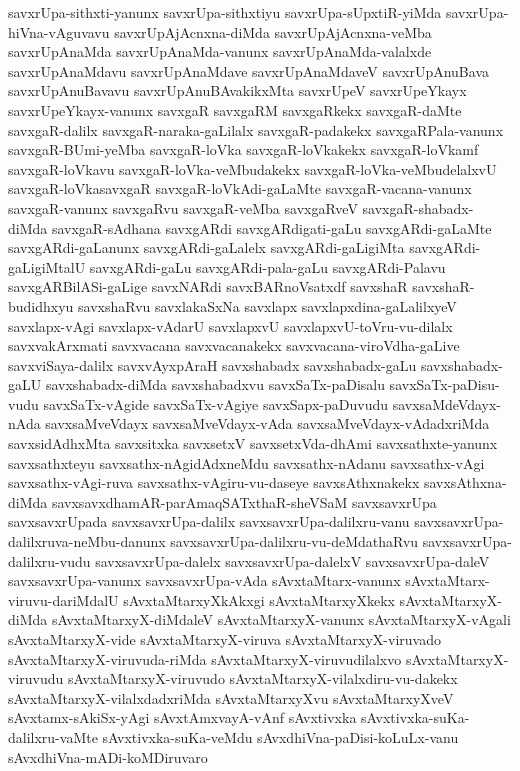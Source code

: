 {savxrUpa-sithxti-yanunx
savxrUpa-sithxtiyu
savxrUpa-sUpxtiR-yiMda
savxrUpa-hiVna-vAguvavu
savxrUpAjAcnxna-diMda
savxrUpAjAcnxna-veMba
savxrUpAnaMda
savxrUpAnaMda-vanunx
savxrUpAnaMda-valalxde
savxrUpAnaMdavu
savxrUpAnaMdave
savxrUpAnaMdaveV
savxrUpAnuBava
savxrUpAnuBavavu
savxrUpAnuBAvakikxMta
savxrUpeV
savxrUpeYkayx
savxrUpeYkayx-vanunx
savxgaR
savxgaRM
savxgaRkekx
savxgaR-daMte
savxgaR-dalilx
savxgaR-naraka-gaLilalx
savxgaR-padakekx
savxgaRPala-vanunx
savxgaR-BUmi-yeMba
savxgaR-loVka
savxgaR-loVkakekx
savxgaR-loVkamf
savxgaR-loVkavu
savxgaR-loVka-veMbudakekx
savxgaR-loVka-veMbudelalxvU
savxgaR-loVkasavxgaR
savxgaR-loVkAdi-gaLaMte
savxgaR-vacana-vanunx
savxgaR-vanunx
savxgaRvu
savxgaR-veMba
savxgaRveV
savxgaR-shabadx-diMda
savxgaR-sAdhana
savxgARdi
savxgARdigati-gaLu
savxgARdi-gaLaMte
savxgARdi-gaLanunx
savxgARdi-gaLalelx
savxgARdi-gaLigiMta
savxgARdi-gaLigiMtalU
savxgARdi-gaLu
savxgARdi-pala-gaLu
savxgARdi-Palavu
savxgARBilASi-gaLige
savxNARdi
savxBARnoVsatxdf
savxshaR
savxshaR-budidhxyu
savxshaRvu
savxlakaSxNa
savxlapx
savxlapxdina-gaLalilxyeV
savxlapx-vAgi
savxlapx-vAdarU
savxlapxvU
savxlapxvU-toVru-vu-dilalx
savxvakArxmati
savxvacana
savxvacanakekx
savxvacana-viroVdha-gaLive
savxviSaya-dalilx
savxvAyxpAraH
savxshabadx
savxshabadx-gaLu
savxshabadx-gaLU
savxshabadx-diMda
savxshabadxvu
savxSaTx-paDisalu
savxSaTx-paDisu-vudu
savxSaTx-vAgide
savxSaTx-vAgiye
savxSapx-paDuvudu
savxsaMdeVdayx-nAda
savxsaMveVdayx
savxsaMveVdayx-vAda
savxsaMveVdayx-vAdadxriMda
savxsidAdhxMta
savxsitxka
savxsetxV
savxsetxVda-dhAmi
savxsathxte-yanunx
savxsathxteyu
savxsathx-nAgidAdxneMdu
savxsathx-nAdanu
savxsathx-vAgi
savxsathx-vAgi-ruva
savxsathx-vAgiru-vu-daseye
savxsAthxnakekx
savxsAthxna-diMda
savxsavxdhamAR-parAmaqSATxthaR-sheVSaM
savxsavxrUpa
savxsavxrUpada
savxsavxrUpa-dalilx
savxsavxrUpa-dalilxru-vanu
savxsavxrUpa-dalilxruva-neMbu-danunx
savxsavxrUpa-dalilxru-vu-deMdathaRvu
savxsavxrUpa-dalilxru-vudu
savxsavxrUpa-dalelx
savxsavxrUpa-dalelxV
savxsavxrUpa-daleV
savxsavxrUpa-vanunx
savxsavxrUpa-vAda
sAvxtaMtarx-vanunx
sAvxtaMtarx-viruvu-dariMdalU
sAvxtaMtarxyXkAkxgi
sAvxtaMtarxyXkekx
sAvxtaMtarxyX-diMda
sAvxtaMtarxyX-diMdaleV
sAvxtaMtarxyX-vanunx
sAvxtaMtarxyX-vAgali
sAvxtaMtarxyX-vide
sAvxtaMtarxyX-viruva
sAvxtaMtarxyX-viruvado
sAvxtaMtarxyX-viruvuda-riMda
sAvxtaMtarxyX-viruvudilalxvo
sAvxtaMtarxyX-viruvudu
sAvxtaMtarxyX-viruvudo
sAvxtaMtarxyX-vilalxdiru-vu-dakekx
sAvxtaMtarxyX-vilalxdadxriMda
sAvxtaMtarxyXvu
sAvxtaMtarxyXveV
sAvxtamx-sAkiSx-yAgi
sAvxtAmxvayA-vAnf
sAvxtivxka
sAvxtivxka-suKa-dalilxru-vaMte
sAvxtivxka-suKa-veMdu
sAvxdhiVna-paDisi-koLuLx-vanu
sAvxdhiVna-mADi-koMDiruvaro
}
